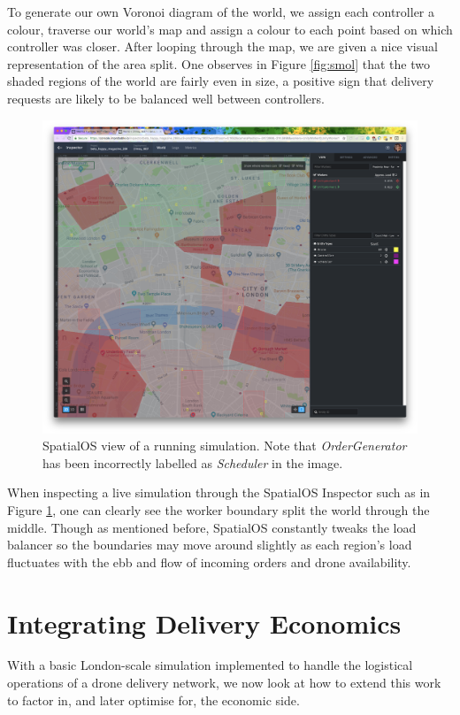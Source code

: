 \documentclass[a4paper,11pt,titlepage]{report}
\begin{document}
\clearpage
To generate our own Voronoi diagram of the world, we assign each controller a colour, traverse our world's map and assign a colour to each point based on which controller was closer. After looping through the map, we are given a nice visual representation of the area split. One observes in Figure \ref{fig:smol} that the two shaded regions of the world are fairly even in size, a positive sign that delivery requests are likely to be balanced well between controllers.

\begin{figure}[!hbpt]
  \center
  \includegraphics[width=0.95\linewidth]{img/gdoc2.png}
  \caption{SpatialOS view of a running simulation. Note that \textit{OrderGenerator} has been incorrectly labelled as \textit{Scheduler} in the image.}
  \label{fig:gdoc2}
\end{figure}

When inspecting a live simulation through the SpatialOS Inspector such as in Figure \ref{fig:gdoc2}, one can clearly see the worker boundary split the world through the middle. Though as mentioned before, SpatialOS constantly tweaks the load balancer so the boundaries may move around slightly as each region's load fluctuates with the ebb and flow of incoming orders and drone availability.

\newpage
\chapter{Integrating Delivery Economics}
With a basic London-scale simulation implemented to handle the logistical operations of a drone delivery network, we now look at how to extend this work to factor in, and later optimise for, the economic side.
\end{document}
